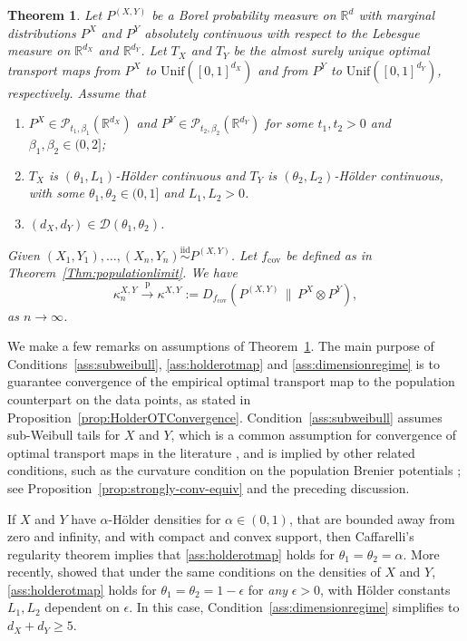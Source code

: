 \documentclass[11pt]{article}
\newtheorem{thm}{Theorem}
\newcommand{\pto}{\xrightarrow{\,\mathrm{p}\,} }
\begin{document}
\begin{thm}\label{thm:ConsistencyGeneralDim}
Let $P^{(X,Y)}$ be a Borel probability measure on $\mathbb{R}^{d}$ with marginal distributions $P^X$ and $P^Y$ absolutely continuous with respect to the Lebesgue measure on $\mathbb{R}^{d_X}$ and $\mathbb{R}^{d_Y}$. Let $T_X$ and $T_Y$ be the almost surely unique optimal transport maps from $P^X$ to $\mathrm{Unif}([0,1]^{d_X})$ and from $P^Y$ to $\mathrm{Unif}([0,1]^{d_Y})$, respectively. Assume that 
\begin{enumerate}[label = (C\arabic*), ref=(C\arabic*)]
    \item\label{ass:subweibull} $P^X\in \mathcal{P}_{t_1, \beta_1}(\mathbb{R}^{d_X})$ and $P^Y\in \mathcal{P}_{t_2, \beta_2}(\mathbb{R}^{d_Y})$ for some $t_1,t_2>0$ and $\beta_1,\beta_2\in (0, 2]$; 
    \item\label{ass:holderotmap} $T_X$ is $(\theta_1, L_1)$-H\"older continuous and $T_Y$ is $(\theta_2, L_2)$-H\"older continuous, with some $\theta_1,\theta_2\in(0,1]$ and $L_1,L_2>0$.
    \item\label{ass:dimensionregime}  $(d_X, d_Y) \in \mathcal{D}(\theta_1, \theta_2)$.
\end{enumerate}
Given $(X_1,Y_1),\ldots,(X_n,Y_n)\stackrel{\mathrm{iid}}{\sim}P^{(X,Y)}$. Let $f_{\mathrm{cov}}$ be defined as in Theorem~\ref{Thm:populationlimit}. We have
\begin{equation*}
\kappa_n^{X,Y} \pto \kappa^{X,Y} := D_{f_\mathrm{cov}}(P^{(X,Y)}\,\|\,P^X\otimes P^Y),
\end{equation*}
as $n\to\infty$.
\end{thm}

We make a few remarks on assumptions of Theorem~\ref{thm:ConsistencyGeneralDim}. The main purpose of Conditions~\ref{ass:subweibull}, \ref{ass:holderotmap} and \ref{ass:dimensionregime} is to guarantee convergence of the empirical optimal transport map to the population counterpart on the data points, as stated in Proposition~\ref{prop:HolderOTConvergence}. Condition~\ref{ass:subweibull} assumes sub-Weibull tails for $X$ and $Y$, which is a common assumption for convergence of optimal transport maps in the literature \citep[see, e.g.][]{Deb2021RatesOE}, and is implied by other related conditions, such as the curvature condition on the population Brenier potentials \citep[Theorem~3]{balakrishnan2025stability}; see Proposition~\ref{prop:strongly-conv-equiv} and the preceding discussion.


If $X$ and $Y$ have $\alpha$-H\"older densities for $\alpha\in(0,1)$, that are bounded away from zero and infinity, and with compact and convex support, then Caffarelli's regularity theorem \citep[][Theorem~4.14]{caffarelli1996boundary, villani2009optimal} implies that \ref{ass:holderotmap} holds for $\theta_1 = \theta_2 = \alpha$. More recently, \citet[Theorem~5.1]{collins2025boundary} showed that under the same conditions on the densities of $X$ and $Y$, \ref{ass:holderotmap} holds for $\theta_1 = \theta_2 = 1-\epsilon$ for \emph{any} $\epsilon > 0$, with H\"older constants $L_1, L_2$ dependent on $\epsilon$. In this case, Condition~\ref{ass:dimensionregime} simplifies to $d_X+d_Y \geq 5$. 
\end{document}
